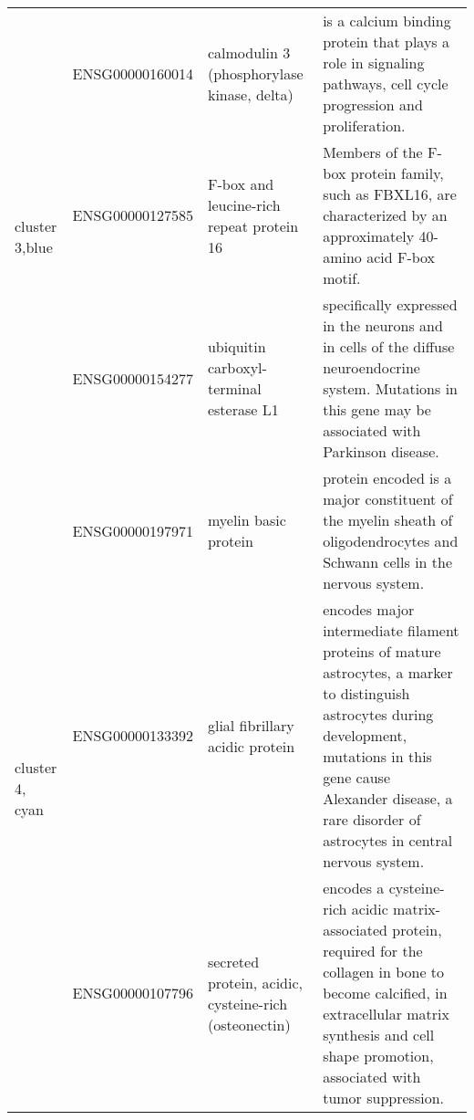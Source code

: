 \begin{table}[htdp]
\begin{center}
\begin{tabular}{|p{0.5in}|c|p{1in}|p{3.5in}|}
 \multirow{3}{4em}{cluster 3,blue}  &  ENSG00000160014 & calmodulin 3 (phosphorylase kinase, delta) & \small is a calcium binding protein that plays a role in signaling pathways, cell cycle progression and proliferation.   \\ 
 					      & ENSG00000127585 &  F-box and leucine-rich repeat protein 16 & \small Members of the F-box protein family, such as FBXL16, are characterized by an approximately 40-amino acid F-box motif. \\
					      & ENSG00000154277 & ubiquitin carboxyl-terminal esterase L1 & \small specifically expressed in the neurons and in cells of the diffuse neuroendocrine system. Mutations in this gene may be associated with Parkinson disease. \\
 \hline
 \multirow{3}{4em}{cluster 4, cyan} & ENSG00000197971 & myelin basic protein & \small protein encoded is a major constituent of the myelin sheath of oligodendrocytes and Schwann cells in the nervous system. \\
 					    & ENSG00000133392 & glial fibrillary acidic protein & \small encodes major intermediate filament proteins of mature astrocytes, a marker to distinguish astrocytes during development, mutations in this gene cause Alexander disease, a rare disorder of astrocytes in central nervous system.\\
					    & ENSG00000107796  & secreted protein, acidic, cysteine-rich (osteonectin)  & \small encodes a cysteine-rich acidic matrix-associated protein, required for the collagen in bone to become calcified, in extracellular matrix synthesis and cell shape promotion, associated with tumor suppression. \\
\hline
\end{tabular}
 \end{center} \label{tab:tab2}
\end{table}



